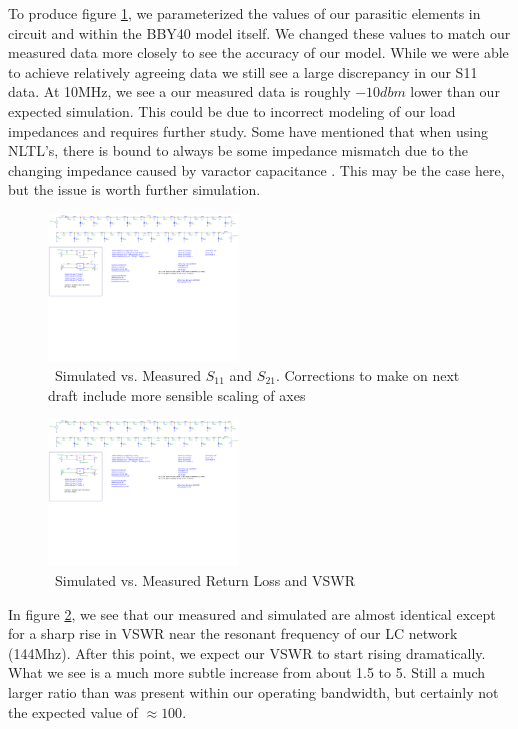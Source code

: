 \documentclass[journal]{IEEEtran}
\begin{document}
To produce figure \ref{fig:S11_S21}, we parameterized the values of our parasitic elements in circuit and within the BBY40 model itself. We changed these values to match our measured data more closely to see the accuracy of our model. While we were able to achieve relatively agreeing data we still see a large discrepancy in our S11 data. At 10MHz, we see a our measured data is roughly $-10dbm$ lower than our expected simulation. This could be due to incorrect modeling of our load impedances and requires further study. Some have mentioned that when using NLTL's, there is bound to always be some impedance mismatch due to the changing impedance caused by varactor capacitance \cite{wilson1991pulse}. This may be the case here, but the issue is worth further simulation.

\begin{figure}[htb]
\centering
\includegraphics[width=0.45\textwidth,page = 2]{Fixed_ZeroBias_Sparam_Sims.pdf}
\caption{\ Simulated vs. Measured $S_{11}$ and $S_{21}$. Corrections to make on next draft include more sensible scaling of axes
}\label{fig:S11_S21}
\end{figure}



\begin{figure}[htb]
\centering
\includegraphics[width=0.45\textwidth,page = 3]{Fixed_ZeroBias_Sparam_Sims.pdf}
\caption{\ Simulated vs. Measured Return Loss and VSWR
}\label{fig:VSWRandReturnLoss}
\end{figure}

In figure \ref{fig:VSWRandReturnLoss}, we see that our measured and simulated are almost identical except for a sharp rise in VSWR near the resonant frequency of our LC network (144Mhz). After this point, we expect our VSWR to start rising dramatically. What we see is a much more subtle increase from about 1.5 to 5. Still a much larger ratio than was present within our operating bandwidth, but certainly not the expected value of $\approx 100$.
\end{document}
